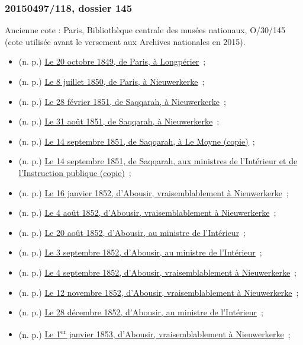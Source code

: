 \documentclass{book}
\begin{document}
\subsubsection*{20150497/118, dossier 145}
\noindent Ancienne cote : Paris, Bibliothèque centrale des musées nationaux, O/30/145 (cote utilisée avant le versement aux Archives nationales en 2015).
\begin{itemize}
\item (n. p.) \hyperlink{CoEg_Mariette_1849-10-20}{Le 20 octobre 1849, de Paris, à Longpérier}~;
\item (n. p.) \hyperlink{CoEg_Mariette_1850-07-08}{Le 8 juillet 1850, de Paris, à Nieuwerkerke}~;
\item (n. p.) \hyperlink{CoEg_Mariette_1851-02-28}{Le 28 février 1851, de Saqqarah, à Nieuwerkerke}~;
\item (n. p.) \hyperlink{CoEg_Mariette_1851-08-31}{Le 31 août 1851, de Saqqarah, à Nieuwerkerke}~;
\item (n. p.) \hyperlink{CoEg_Mariette_1851-09-14a}{Le 14 septembre 1851, de Saqqarah, à Le Moyne (copie)}~;
\item (n. p.) \hyperlink{CoEg_Mariette_1851-09-14b}{Le 14 septembre 1851, de Saqqarah, aux ministres de l’Intérieur et de l’Instruction publique (copie)}~;
\item (n. p.) \hyperlink{CoEg_Mariette_1852-01-16}{Le 16 janvier 1852, d’Abousir, vraisemblablement à Nieuwerkerke}~;
\item (n. p.) \hyperlink{CoEg_Mariette_1852-08-04}{Le 4 août 1852, d’Abousir, vraisemblablement à Nieuwerkerke}~;
\item (n. p.) \hyperlink{CoEg_Mariette_1852-08-20}{Le 20 août 1852, d’Abousir, au ministre de l'Intérieur}~;
\item (n. p.) \hyperlink{CoEg_Mariette_1852-09-03}{Le 3 septembre 1852, d’Abousir, au ministre de l'Intérieur}~;
\item (n. p.) \hyperlink{CoEg_Mariette_1852-09-04}{Le 4 septembre 1852, d’Abousir, vraisemblablement à Nieuwerkerke}~;
\item (n. p.) \hyperlink{CoEg_Mariette_1852-11-12}{Le 12 novembre 1852, d’Abousir, vraisemblablement à Nieuwerkerke}~;
\item (n. p.) \hyperlink{CoEg_Mariette_1852-12-28}{Le 28 décembre 1852, d’Abousir, au ministre de l'Intérieur}~;
\item (n. p.) \hyperlink{CoEg_Mariette_1853-01-01}{Le 1\textsuperscript{er} janvier 1853, d’Abousir, vraisemblablement à Nieuwerkerke}~;

\end{itemize}
\end{document}
